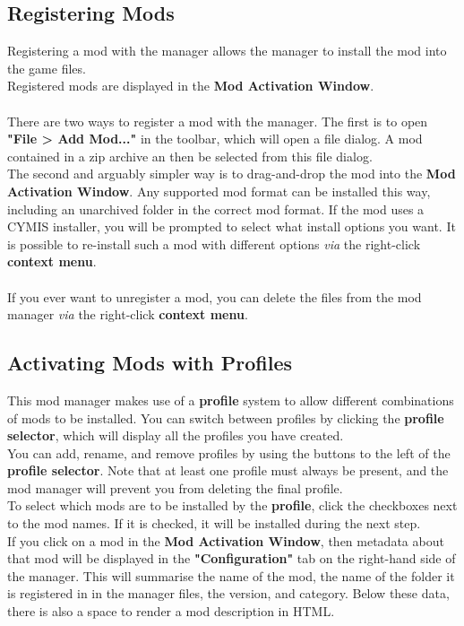 \documentclass{article}
\begin{document}
\subsection{Registering Mods}
Registering a mod with the manager allows the manager to install the mod into the game files.\\
Registered mods are displayed in the \textbf{Mod Activation Window}.\\\\
There are two ways to register a mod with the manager. The first is to open \textbf{"File > Add Mod..."} in the toolbar, which will open a file dialog. A mod contained in a zip archive an then be selected from this file dialog.\\
The second and arguably simpler way is to drag-and-drop the mod into the \textbf{Mod Activation Window}. Any supported mod format can be installed this way, including an unarchived folder in the correct mod format.
If the mod uses a CYMIS installer, you will be prompted to select what install options you want. It is possible to re-install such a mod with different options \textit{via} the right-click \textbf{context menu}.\\\\
If you ever want to unregister a mod, you can delete the files from the mod manager \textit{via} the right-click \textbf{context menu}.

\subsection{Activating Mods with Profiles}
This mod manager makes use of a \textbf{profile} system to allow different combinations of mods to be installed. You can switch between profiles by clicking the \textbf{profile selector}, which will display all the profiles you have created.\\
You can add, rename, and remove profiles by using the buttons to the left of the \textbf{profile selector}. Note that at least one profile must always be present, and the mod manager will prevent you from deleting the final profile.\\
To select which mods are to be installed by the \textbf{profile}, click the checkboxes next to the mod names. If it is checked, it will be installed during the next step.\\
If you click on a mod in the \textbf{Mod Activation Window}, then metadata about that mod will be displayed in the \textbf{"Configuration"} tab on the right-hand side of the manager. This will summarise the name of the mod, the name of the folder it is registered in in the manager files, the version, and category. Below these data, there is also a space to render a mod description in HTML.
\end{document}
